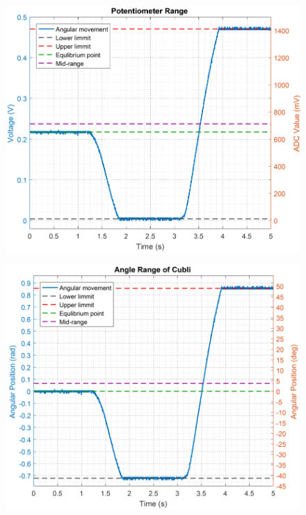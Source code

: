 \begin{minipage}{\linewidth}
	\begin{minipage}{0.45\linewidth}
		\begin{figure}[H]
			\includegraphics[scale=.5]{figures/PotentiometerResolution}
			\centering
			\captionsetup{justification=centering}
			\label{PotentiometerResolution}
		\end{figure}
	\end{minipage}
	\hspace{0.03\linewidth}
	\begin{minipage}{0.45\linewidth}
		\begin{figure}[H]
			\includegraphics[scale=.5]{figures/PotentiometerResolutionDegRad}
			\centering
			\captionsetup{justification=centering}
			\label{PotentiometerResolutionRadDeg}
		\end{figure}
	\end{minipage}
\end{minipage}

